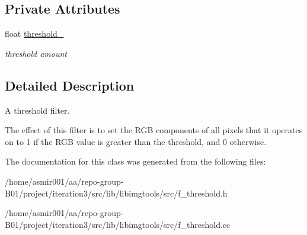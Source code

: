 \subsection*{Private Attributes}
\begin{DoxyCompactItemize}
\item 
float \hyperlink{classimage__tools_1_1FThreshold_aa6cad820a5bfbdc61f38e34aca51018e}{threshold\+\_\+}\hypertarget{classimage__tools_1_1FThreshold_aa6cad820a5bfbdc61f38e34aca51018e}{}\label{classimage__tools_1_1FThreshold_aa6cad820a5bfbdc61f38e34aca51018e}

\begin{DoxyCompactList}\small\item\em threshold amount \end{DoxyCompactList}\end{DoxyCompactItemize}


\subsection{Detailed Description}
A threshold filter. 

The effect of this filter is to set the R\+GB components of all pixels that it operates on to 1 if the R\+GB value is greater than the threshold, and 0 otherwise. 

The documentation for this class was generated from the following files\+:\begin{DoxyCompactItemize}
\item 
/home/asmir001/aa/repo-\/group-\/\+B01/project/iteration3/src/lib/libimgtools/src/f\+\_\+threshold.\+h\item 
/home/asmir001/aa/repo-\/group-\/\+B01/project/iteration3/src/lib/libimgtools/src/f\+\_\+threshold.\+cc\end{DoxyCompactItemize}
